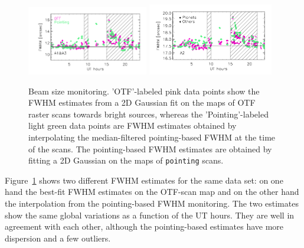 \begin{figure}[ht!]
  \begin{center}
    \includegraphics[clip=true, trim={0.9cm, 0.5cm, 0.5cm, 0.5cm}, width=0.4725\textwidth]{Figures/Beam_monitoring_with_otfs_vs_ut_compare_pointings_1mm.pdf}
    \includegraphics[clip=true, trim={0.5cm, 0.5cm, 0.5cm, 0.5cm}, width=0.4875\textwidth]{Figures/Beam_monitoring_with_otfs_vs_ut_compare_pointings_a2.pdf}
    \caption[Beam size monitoring comparison]{Beam size monitoring.
     'OTF'-labeled pink data points show the FWHM estimates from a 2D
    Gaussian fit on the maps of OTF raster scans towards bright
    sources, whereas the 'Pointing'-labeled light green data points
    are FWHM estimates obtained by interpolating the {\lp
    median-filtered} pointing-based FWHM at the time of the
    scans. {\lp The
    pointing-based FWHM estimates are obtained by fitting a 2D Gaussian on the
    maps of {\tt pointing} scans.}}
\label{fig:beam_monitoring_compare}
\end{center}
\end{figure}
%
Figure~\ref{fig:beam_monitoring_compare} shows two different FWHM %
estimates for the same data set: on one hand the best-fit FWHM %
estimates on the OTF-scan map and on the other hand the interpolation from
the pointing-based FWHM %
monitoring. The two estimates show the same global variations as a
function of the UT hours. They are well in agreement with each
other, although the pointing-based estimates have more dispersion and
a few outliers.



